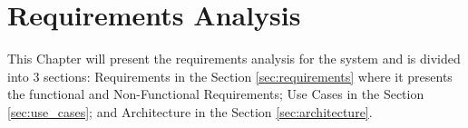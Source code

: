 \chapter{Requirements Analysis}
\label{ch:requirements_analysis}

This Chapter will present the requirements analysis for the system and is
divided into 3 sections: Requirements in the Section \ref{sec:requirements}
where it presents the functional and Non-Functional Requirements; Use Cases in
the Section \ref{sec:use_cases}; and Architecture in the Section
\ref{sec:architecture}.




